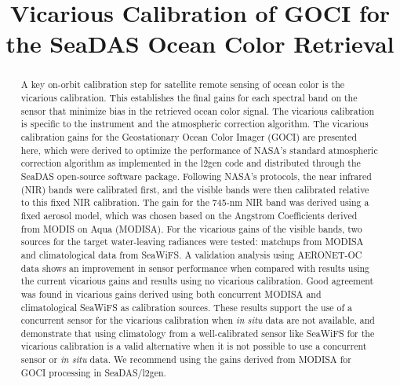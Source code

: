 \documentclass[]{interact}
\theoremstyle{plain}%
\theoremstyle{definition}
\theoremstyle{remark}
\begin{document}

\title{Vicarious Calibration of GOCI for the SeaDAS Ocean Color Retrieval}

\author{
}

\maketitle

\begin{abstract}

A key on-orbit calibration step for satellite remote sensing of ocean color is the vicarious calibration.
This establishes the final gains for each spectral band on the sensor that minimize bias in the retrieved ocean color signal.
The vicarious calibration is specific to the instrument and the atmospheric correction algorithm.
The vicarious calibration gains for the Geostationary Ocean Color Imager (GOCI) are presented here, which were derived to optimize the performance of NASA's standard atmospheric correction algorithm as implemented in the l2gen code and distributed through the SeaDAS open-source software package.
Following NASA's protocols, the near infrared (NIR) bands were calibrated first, and the visible bands were then calibrated relative to this fixed NIR calibration.
The gain for the 745-nm NIR band was derived using a fixed aerosol model, which was chosen based on the Angstrom Coefficients derived from MODIS on Aqua (MODISA). 
For the vicarious gains of the visible bands, two sources for the target water-leaving radiances were tested: matchups from MODISA and climatological data from SeaWiFS. 
A validation analysis using AERONET-OC data shows an improvement in sensor performance when compared with results using the current vicarious gains and results using no vicarious calibration. 
Good agreement was found in vicarious gains derived using both concurrent MODISA and climatological SeaWiFS as calibration sources.  
These results support the use of a concurrent sensor for the vicarious calibration when {\it in situ} data are not available, and demonstrate that using climatology from a well-calibrated sensor like SeaWiFS for the vicarious calibration is a valid alternative when it is not possible to use a concurrent sensor or {\it in situ} data. 
We recommend using the gains derived from MODISA for GOCI processing in SeaDAS/l2gen.
%
\end{abstract}
\end{document}
